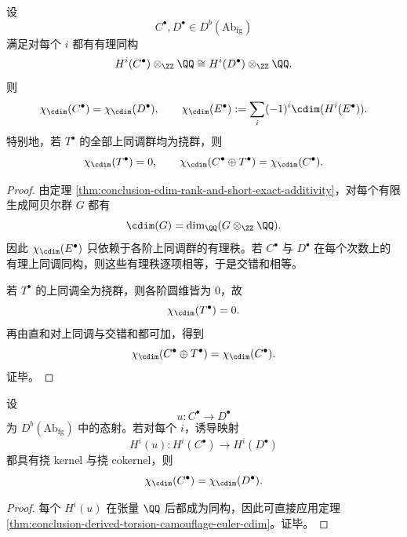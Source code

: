 \begin{theorem}\label{thm:conclusion-derived-torsion-camouflage-euler-cdim}
设
\[
C^\bullet,D^\bullet\in D^b(\mathrm{Ab}_{\mathrm{fg}})
\]
满足对每个 \(i\) 都有有理同构
\[
H^i(C^\bullet)\otimes_{\ZZ}\QQ
\cong
H^i(D^\bullet)\otimes_{\ZZ}\QQ.
\]
则
\[
\chi_{\cdim}(C^\bullet)=\chi_{\cdim}(D^\bullet),
\qquad
\chi_{\cdim}(E^\bullet):=\sum_i(-1)^i\cdim(H^i(E^\bullet)).
\]
特别地，若 \(T^\bullet\) 的全部上同调群均为挠群，则
\[
\chi_{\cdim}(T^\bullet)=0,
\qquad
\chi_{\cdim}(C^\bullet\oplus T^\bullet)=\chi_{\cdim}(C^\bullet).
\]
\end{theorem}
\begin{proof}
由定理 \ref{thm:conclusion-cdim-rank-and-short-exact-additivity}，对每个有限生成阿贝尔群 \(G\) 都有
\[
\cdim(G)=\dim_{\QQ}(G\otimes_{\ZZ}\QQ).
\]
因此 \(\chi_{\cdim}(E^\bullet)\) 只依赖于各阶上同调群的有理秩。若 \(C^\bullet\) 与 \(D^\bullet\) 在每个次数上的有理上同调同构，则这些有理秩逐项相等，于是交错和相等。

若 \(T^\bullet\) 的上同调全为挠群，则各阶圆维皆为 \(0\)，故
\[
\chi_{\cdim}(T^\bullet)=0.
\]
再由直和对上同调与交错和都可加，得到
\[
\chi_{\cdim}(C^\bullet\oplus T^\bullet)=\chi_{\cdim}(C^\bullet).
\]
证毕。
\end{proof}

\begin{corollary}\label{cor:conclusion-derived-quasi-isogeny-euler-cdim-invariance}
设
\[
u:C^\bullet\to D^\bullet
\]
为 \(D^b(\mathrm{Ab}_{\mathrm{fg}})\) 中的态射。若对每个 \(i\)，诱导映射
\[
H^i(u):H^i(C^\bullet)\to H^i(D^\bullet)
\]
都具有挠 kernel 与挠 cokernel，则
\[
\chi_{\cdim}(C^\bullet)=\chi_{\cdim}(D^\bullet).
\]
\end{corollary}
\begin{proof}
每个 \(H^i(u)\) 在张量 \(\QQ\) 后都成为同构，因此可直接应用定理 \ref{thm:conclusion-derived-torsion-camouflage-euler-cdim}。证毕。
\end{proof}

